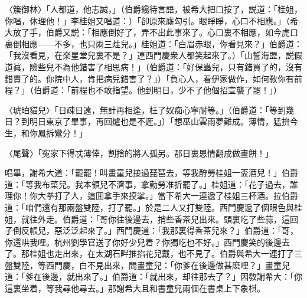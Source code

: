 \begin{myquote}
{\markfont〈簇御林〉}「人都道，他志誠，」{\marktext（伯爵纔待言語，被希大把口按了，説道：「桂姐，你唱，休理他！」李桂姐又唱道：）}「卻原來廝勾引。眼睜睜，心口不相應。」{\marktext（希大放了手，伯爵又説：「相應倒好了，弄不出此事來了。心口裏不相應，如今虎口裏倒相應——不多，也只兩三炷兒。」桂姐道：「白眉赤眼，你看見來？」伯爵道：「我沒看見，在楽星堂兒裏不是？」連西門慶衆人都笑起來了。）}「山誓海盟，説假道眞，險些兒不為他錯害了相思病！」{\marktext（伯爵道：「好保蟲兒，只有錯買了的，沒有錯賣了的。你院中人，肯把病兒錯害了？」）}「負心人，看伊家做作，如何敎你有前程？」{\marktext（伯爵道：「前程也不敢指望。他到明日，少不了他個招宣襲了罷！」）}

{\markfont〈琥珀貓兒〉}「日疎日遠，無計再相逢，枉了奴痴心寜耐等。」{\marktext（伯爵道：「等到幾日？到明日東京了畢事，再回爐也是不遲。」）}「想巫山雲雨夢難成。薄情，猛拚今生，和你鳳拆鸞分！」

{\markfont〈尾聲〉}「寃家下得忒薄倖，割捨的將人孤另。那日裏恩情翻成做畫餅！」
\end{myquote}

唱畢，謝希大道：「罷罷！叫畫童兒接過琵琶去，等我酧勞桂姐一盃酒兒！」伯爵道：「等我布菜兒。我本領兒不濟事，拿勤勞准折罷了。」桂姐道：「花子過去，誰理你！你大拳打了人，這囬拿手來摸挲。」當下希大一連遞了桂姐三杯酒。拉伯爵道：「咱們還有那兩盤雙陸，打了罷。」於是二人又打雙陸。西門慶遞了個眼色與桂姐，就往外走。伯爵道：「哥你往後邊去，捎些香茶兒出來。頭裏吃了些蒜，這回子倒反帳兒，惡泛泛起來了。」西門慶道：「我那裏得香茶兒來？」伯爵道：「哥，你還哄我哩。杭州劉學官送了你好少兒着？你獨吃也不好。」西門慶笑的後邊去了。那桂姐也走出來，在太湖石畔推掐花兒戴，也不見了。伯爵與希大一連打了三盤雙陸，等西門慶，白不見出來，問畫童兒：「你爹在後邊做甚麽哩？」畫童兒道：「爹在後邊，就出來了。」伯爵道：「就出來，却往那去了？」因敎謝希大：「你這裏坐着，等我尋他尋去。」那謝希大且和書童兒兩個在書桌上下象棋。

